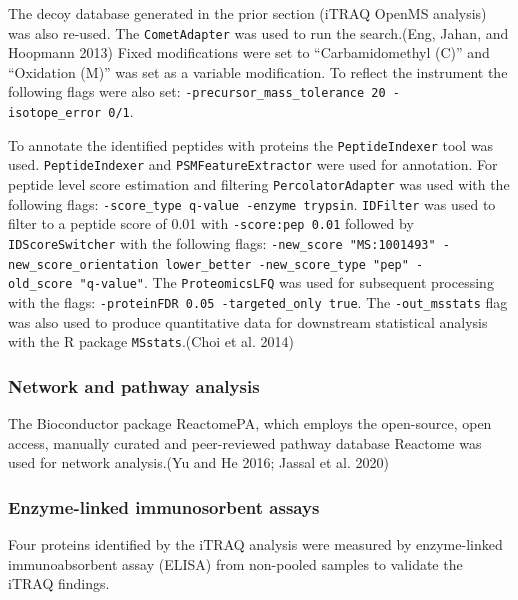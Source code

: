 \documentclass[9pt,lineno]{elife}
\begin{document}
The decoy database generated in the prior section (iTRAQ OpenMS analysis) was also re-used.
The \texttt{CometAdapter} was used to run the search.(Eng, Jahan, and Hoopmann 2013) Fixed modifications were set to ``Carbamidomethyl (C)'' and ``Oxidation (M)'' was set as a variable modification.
To reflect the instrument the following flags were also set: \texttt{-precursor\_mass\_tolerance\ 20\ -isotope\_error\ 0/1}.

To annotate the identified peptides with proteins the \texttt{PeptideIndexer} tool was used.
\texttt{PeptideIndexer} and \texttt{PSMFeatureExtractor} were used for annotation.
For peptide level score estimation and filtering \texttt{PercolatorAdapter} was used with the following flags: \texttt{-score\_type\ q-value\ -enzyme\ trypsin}.
\texttt{IDFilter} was used to filter to a peptide score of 0.01 with \texttt{-score:pep\ 0.01} followed by \texttt{IDScoreSwitcher} with the following flags: \texttt{-new\_score\ "MS:1001493"\ -new\_score\_orientation\ lower\_better\ -new\_score\_type\ "pep"\ -old\_score\ "q-value"}.
The \texttt{ProteomicsLFQ} was used for subsequent processing with the flags: \texttt{-proteinFDR\ 0.05\ -targeted\_only\ true}.
The \texttt{-out\_msstats} flag was also used to produce quantitative data for downstream statistical analysis with the R package \texttt{MSstats}.(Choi et al. 2014)

\hypertarget{pathway-analysis-chap3}{%
\subsubsection{Network and pathway analysis}\label{pathway-analysis-chap3}}

The Bioconductor package ReactomePA, which employs the open-source, open access, manually curated and peer-reviewed pathway database Reactome was used for network analysis.(Yu and He 2016; Jassal et al. 2020)

\hypertarget{enzyme-linked-immunosorbent-assays}{%
\subsubsection{Enzyme-linked immunosorbent assays}\label{enzyme-linked-immunosorbent-assays}}

Four proteins identified by the iTRAQ analysis were measured by enzyme-linked immunoabsorbent assay (ELISA) from non-pooled samples to validate the iTRAQ findings.
\end{document}

